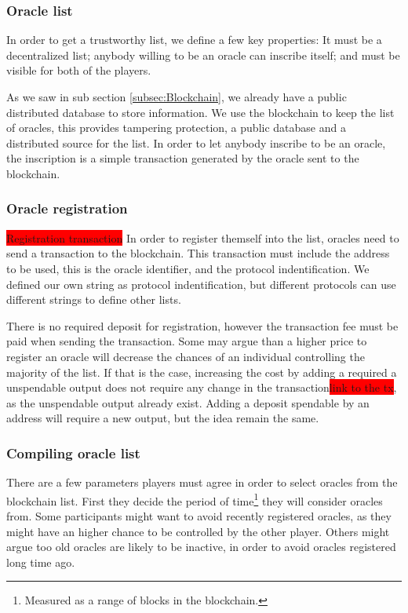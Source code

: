 \subsubsection{Oracle list}

In order to get a trustworthy list, we define a few key properties:
It must be a decentralized list; anybody willing to be an oracle can inscribe
  itself; and must be visible for both of the players.

As we saw in sub section \ref{subsec:Blockchain}, we already have a
  public distributed database to store information.
We use the blockchain to keep the list of oracles, this provides tampering
  protection, a public database and a distributed source for the list.
In order to let anybody inscribe to be an oracle, the inscription is a simple
 transaction generated by the oracle sent to the blockchain.

\subsubsection{Oracle registration}
\colorbox{red}{Registration transaction}
In order to register themself into the list, oracles need to send a transaction
  to the blockchain.
This transaction must include the address to be used, this is the oracle
  identifier, and the protocol indentification.
We defined our own string as protocol indentification, but different protocols
  can use different strings to define other lists.

There is no required deposit for registration, however the transaction fee must
  be paid when sending the transaction.
Some may argue than a higher price to register an oracle will decrease the
  chances of an individual controlling the majority of the list.
If that is the case, increasing the cost by adding a required a unspendable
  output does not require any change in the transaction\colorbox{red}{link to the tx}, as the unspendable
  output already exist. Adding a deposit spendable by an address will require
  a new output, but the idea remain the same.

\subsubsection{Compiling oracle list}

There are a few parameters players must agree in order to select oracles from
  the blockchain list.
First they decide the period of time\footnote{Measured as a range of blocks in
  the blockchain.} they will consider oracles from.
Some participants might want to avoid recently registered oracles, as they might
  have an higher chance to be controlled by the other player.
Others might argue too old oracles are likely to be inactive, in order to avoid
  oracles registered long time ago.

